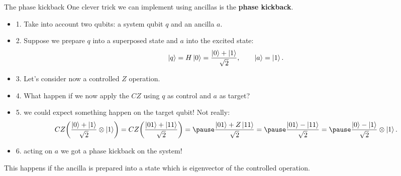 \documentclass[aspectratio=169, 8pt, xcolor={svgnames}, hyperref={linkcolor=black}]{beamer}
\begin{document}
\begin{frame}{The phase kickback}
One clever trick we can implement using ancillas is the \textbf{phase kickback}.
\pause

\begin{itemize}[noitemsep]
\item{1.} Take into account two qubits: a system qubit $q$ and an ancilla $a$.  \pause
\item{2.} Suppose we prepare $q$ into a superposed state and $a$ into the excited state:
$$ \ket{q}=H\ket{0} = \frac{\ket{0}+\ket{1}}{\sqrt{2}}, \qquad \ket{a}=\ket{1}. $$ \pause
\item{3.} Let's consider now a controlled $Z$ operation. \pause
\item{4.} What happen if we now apply the $CZ$ using $q$ as control and $a$
as target? \pause
\item{5.} we could expect something happen on the target qubit! Not really: \pause
$$ CZ \biggl( \frac{\ket{0}+\ket{1}}{\sqrt{2}} \otimes \ket{1} \biggr)  = 
CZ \biggl( \frac{\ket{01}+\ket{11}}{\sqrt{2}} \biggr) = \pause
\frac{\ket{01}+Z\ket{11}}{\sqrt{2}} = \pause
\frac{\ket{01}-\ket{11}}{\sqrt{2}} = \pause
\frac{\ket{0}-\ket{1}}{\sqrt{2}} \otimes \ket{1}.
$$ \pause
\item{6.} acting on $a$ we got a phase kickback on the system!
\end{itemize}

\pause
\begin{tcolorbox}[colback=red!15, title=Important]
This happens if the ancilla is prepared into a state which is eigenvector of the 
controlled operation.
\end{tcolorbox}

\end{frame}
\end{document}
